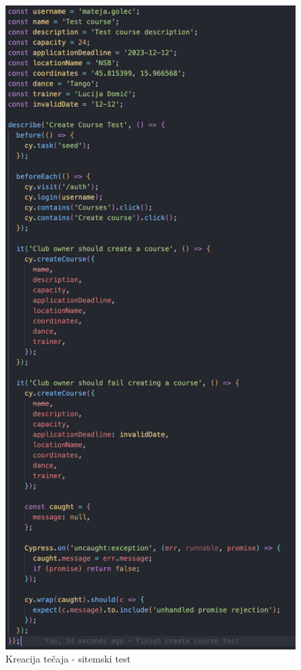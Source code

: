 \begin{figure}[H]
			\includegraphics[scale=0.5]{slike/test3.PNG} %
			\centering
			\caption{Kreacija tečaja - sitemski test}
			\label{fig:rez3}
			\end{figure}
			 
